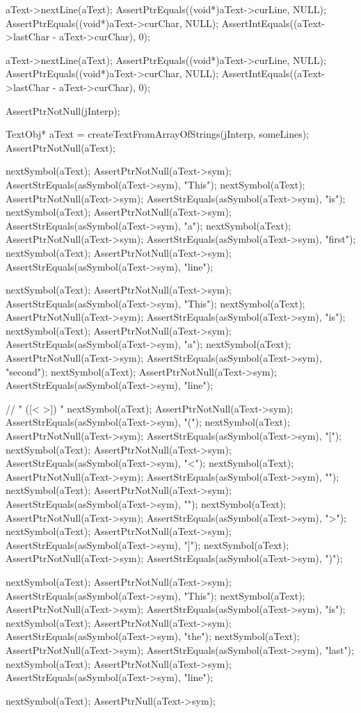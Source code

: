   aText->nextLine(aText);
  AssertPtrEquals((void*)aText->curLine, NULL);
  AssertPtrEquals((void*)aText->curChar, NULL);
  AssertIntEquals((aText->lastChar - aText->curChar), 0);

  aText->nextLine(aText);
  AssertPtrEquals((void*)aText->curLine, NULL);
  AssertPtrEquals((void*)aText->curChar, NULL);
  AssertIntEquals((aText->lastChar - aText->curChar), 0);
\stopCTest
\stopTestCase

\startCTest
  AssertPtrNotNull(jInterp);

  TextObj* aText = createTextFromArrayOfStrings(jInterp, someLines);
  AssertPtrNotNull(aText);

  nextSymbol(aText);
  AssertPtrNotNull(aText->sym);
  AssertStrEquals(asSymbol(aText->sym), "This");
  nextSymbol(aText);
  AssertPtrNotNull(aText->sym);
  AssertStrEquals(asSymbol(aText->sym), "is");
  nextSymbol(aText);
  AssertPtrNotNull(aText->sym);
  AssertStrEquals(asSymbol(aText->sym), "a");
  nextSymbol(aText);
  AssertPtrNotNull(aText->sym);
  AssertStrEquals(asSymbol(aText->sym), "first");
  nextSymbol(aText);
  AssertPtrNotNull(aText->sym);
  AssertStrEquals(asSymbol(aText->sym), "line");

  nextSymbol(aText);
  AssertPtrNotNull(aText->sym);
  AssertStrEquals(asSymbol(aText->sym), "This");
  nextSymbol(aText);
  AssertPtrNotNull(aText->sym);
  AssertStrEquals(asSymbol(aText->sym), "is");
  nextSymbol(aText);
  AssertPtrNotNull(aText->sym);
  AssertStrEquals(asSymbol(aText->sym), "a");
  nextSymbol(aText);
  AssertPtrNotNull(aText->sym);
  AssertStrEquals(asSymbol(aText->sym), "second");
  nextSymbol(aText);
  AssertPtrNotNull(aText->sym);
  AssertStrEquals(asSymbol(aText->sym), "line");

  // " ([<{ }>]) "
  nextSymbol(aText);
  AssertPtrNotNull(aText->sym);
  AssertStrEquals(asSymbol(aText->sym), "(");
  nextSymbol(aText);
  AssertPtrNotNull(aText->sym);
  AssertStrEquals(asSymbol(aText->sym), "[");
  nextSymbol(aText);
  AssertPtrNotNull(aText->sym);
  AssertStrEquals(asSymbol(aText->sym), "<");
  nextSymbol(aText);
  AssertPtrNotNull(aText->sym);
  AssertStrEquals(asSymbol(aText->sym), "{");
  nextSymbol(aText);
  AssertPtrNotNull(aText->sym);
  AssertStrEquals(asSymbol(aText->sym), "}");
  nextSymbol(aText);
  AssertPtrNotNull(aText->sym);
  AssertStrEquals(asSymbol(aText->sym), ">");
  nextSymbol(aText);
  AssertPtrNotNull(aText->sym);
  AssertStrEquals(asSymbol(aText->sym), "]");
  nextSymbol(aText);
  AssertPtrNotNull(aText->sym);
  AssertStrEquals(asSymbol(aText->sym), ")");

  nextSymbol(aText);
  AssertPtrNotNull(aText->sym);
  AssertStrEquals(asSymbol(aText->sym), "This");
  nextSymbol(aText);
  AssertPtrNotNull(aText->sym);
  AssertStrEquals(asSymbol(aText->sym), "is");
  nextSymbol(aText);
  AssertPtrNotNull(aText->sym);
  AssertStrEquals(asSymbol(aText->sym), "the");
  nextSymbol(aText);
  AssertPtrNotNull(aText->sym);
  AssertStrEquals(asSymbol(aText->sym), "last");
  nextSymbol(aText);
  AssertPtrNotNull(aText->sym);
  AssertStrEquals(asSymbol(aText->sym), "line");

  nextSymbol(aText);
  AssertPtrNull(aText->sym);
\stopCTest
\stopTestCase
\stopTestSuite